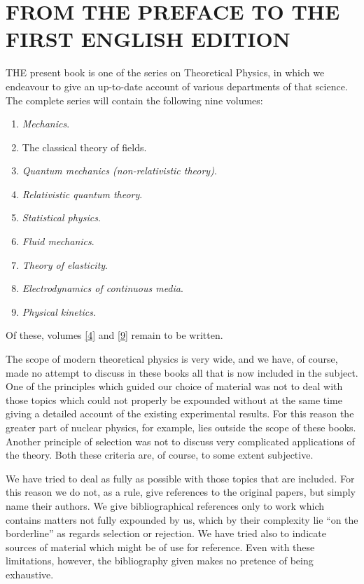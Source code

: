 \chapter{FROM THE PREFACE TO THE FIRST ENGLISH EDITION}
THE present book is one of the series on Theoretical Physics, in which we endeavour to give an up-to-date account of various departments of that science. The complete series will contain the following nine volumes:
\begin{itshape}
\begin{enumerate}
	\item \textit{Mechanics}.\label{1}
	\item The classical theory of fields.\label{2}
	\item \textit{Quantum mechanics (non-relativistic theory)}.\label{3}
	\item \textit{Relativistic quantum theory}.\label{4}
	\item \textit{Statistical physics}.\label{5}
	\item \textit{Fluid mechanics}.\label{6}
	\item \textit{Theory of elasticity}.\label{7}
	\item \textit{Electrodynamics of continuous media}.\label{8}
	\item \textit{Physical kinetics}.\label{9}
\end{enumerate}
\end{itshape}


Of these, volumes \ref{4} and \ref{9} remain to be written.

The scope of modern theoretical physics is very wide, and we have, of course, made no attempt to discuss in these books all that is now included in the subject. One of the principles which guided our choice of material was not to deal with those topics which could not properly be expounded without at the same time giving a detailed account of the existing experimental results. For this reason the greater part of nuclear physics, for example, lies outside the scope of these books. Another principle of selection was not to discuss very complicated applications of the theory. Both these criteria are, of course, to some extent subjective.

We have tried to deal as fully as possible with those topics that are included. For this reason we do not, as a rule, give references to the original papers, but simply name their authors. We give bibliographical references only to work which contains matters not fully expounded by us, which by their complexity lie “on the borderline” as regards selection or rejection. We have tried also to indicate sources of material which might be of use for reference. Even with these limitations, however, the bibliography given makes no pretence of being exhaustive.

